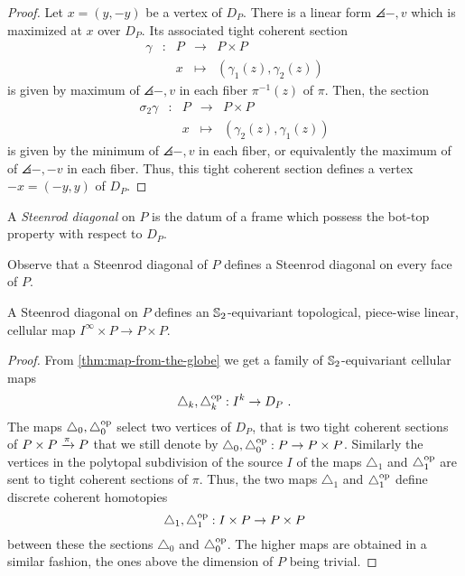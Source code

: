 \begin{proof}
	Let $x=(y,-y)$ be a vertex of $D_P$.
	There is a linear form $\angles{-,v}$ which is maximized at $x$ over $D_P$.
	Its associated tight coherent section
	\begin{equation*}
		\begin{matrix}
			\gamma & : & P & \to & P \times P \\
			& & x  & \mapsto & (\gamma_1(z),\gamma_2(z))
		\end{matrix}
	\end{equation*}
	is given by maximum of $\angles{-,v}$ in each fiber $\pi^{-1}(z)$ of $\pi$. Then, the section
	\begin{equation*}
		\begin{matrix}
			\sigma_2\gamma & : & P & \to & P \times P \\
			& & x  & \mapsto & (\gamma_2(z),\gamma_1(z))
		\end{matrix}
	\end{equation*}
	is given by the minimum of $\angles{-,v}$ in each fiber, or equivalently the maximum of of $\angles{-,-v}$ in each fiber.
	Thus, this tight coherent section defines a vertex $-x=(-y,y)$ of $D_P$.
\end{proof}

\begin{definition}
	A \emph{Steenrod diagonal} on $P$ is the datum of a frame which possess the bot-top property with respect to $D_P$.
\end{definition}

Observe that a Steenrod diagonal of $P$ defines a Steenrod diagonal on every face of $P$. 

\begin{theorem}
	A Steenrod diagonal on $P$ defines an $\mathbb{S}_2$-equivariant topological, piece-wise linear, cellular map $I^\infty \times P \to P \times P$.
\end{theorem}

\begin{proof}
	From \cref{thm:map-from-the-globe} we get a family of $\mathbb{S}_2$-equivariant cellular maps
	\[
	\triangle_k, \triangle_k^{\mathrm{op}} : I^k \to D_P \ . 
	\]
	The maps $\triangle_0, \triangle_0^{\mathrm{op}}$ select two vertices of $D_P$, that is two tight coherent sections of $P\times P \xrightarrow{\pi} P$ that we still denote by $\triangle_0, \triangle_0^{\mathrm{op}} : P \to P\times P$.
	Similarly the vertices in the polytopal subdivision of the source $I$ of the maps $\triangle_1$ and $\triangle_1^{\mathrm{op}}$ are sent to tight coherent sections of $\pi$. 
	Thus, the two maps $\triangle_1$ and $\triangle_1^{\mathrm{op}}$ define discrete coherent homotopies 
	\[
	\triangle_1, \triangle_1^{\mathrm{op}} : I\times P \to P \times P  
	\]
	between these the sections $\triangle_0$ and $\triangle_0^{\mathrm{op}}$. 
	The higher maps are obtained in a similar fashion, the ones above the dimension of $P$ being trivial. 
\end{proof}

